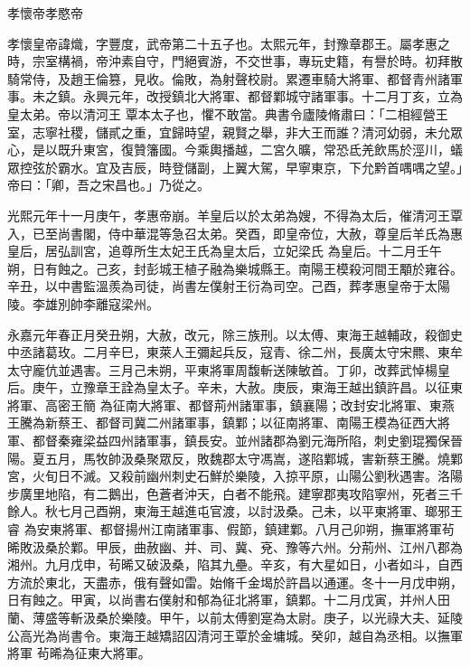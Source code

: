 
\begin{pinyinscope}

 孝懷帝孝愍帝



 孝懷皇帝諱熾，字豐度，武帝第二十五子也。太熙元年，封豫章郡王。屬孝惠之時，宗室構禍，帝沖素自守，門絕賓游，不交世事，專玩史籍，有譽於時。初拜散騎常侍，及趙王倫篡，見收。倫敗，為射聲校尉。累遷車騎大將軍、都督青州諸軍事。未之鎮。永興元年，改授鎮北大將軍、都督鄴城守諸軍事。十二月丁亥，立為皇太弟。帝以清河王
 覃本太子也，懼不敢當。典書令廬陵脩肅曰：「二相經營王室，志寧社稷，儲貳之重，宜歸時望，親賢之舉，非大王而誰？清河幼弱，未允眾心，是以既升東宮，復贊籓國。今乘輿播越，二宮久曠，常恐氐羌飲馬於涇川，蟻眾控弦於霸水。宜及吉辰，時登儲副，上翼大駕，早寧東京，下允黔首喁喁之望。」帝曰：「卿，吾之宋昌也。」乃從之。



 光熙元年十一月庚午，孝惠帝崩。羊皇后以於太弟為嫂，不得為太后，催清河王覃入，已至尚書閣，侍中華混等急召太弟。癸酉，即皇帝位，大赦，尊皇后羊氏為惠皇后，居弘訓宮，追尊所生太妃王氏為皇太后，立妃梁氏
 為皇后。十二月壬午朔，日有蝕之。己亥，封彭城王植子融為樂城縣王。南陽王模殺河間王顒於雍谷。辛丑，以中書監溫羨為司徒，尚書左僕射王衍為司空。己酉，葬孝惠皇帝于太陽陵。李雄別帥李離寇梁州。



 永嘉元年春正月癸丑朔，大赦，改元，除三族刑。以太傅、東海王越輔政，殺御史中丞諸葛玫。二月辛巳，東萊人王彌起兵反，寇青、徐二州，長廣太守宋羆、東牟太守龐伉並遇害。三月己未朔，平東將軍周馥斬送陳敏首。丁卯，改葬武悼楊皇后。庚午，立豫章王詮為皇太子。辛未，大赦。庚辰，東海王越出鎮許昌。以征東將軍、高密王簡
 為征南大將軍、都督荊州諸軍事，鎮襄陽；改封安北將軍、東燕王騰為新蔡王、都督司冀二州諸軍事，鎮鄴；以征南將軍、南陽王模為征西大將軍、都督秦雍梁益四州諸軍事，鎮長安。並州諸郡為劉元海所陷，刺史劉琨獨保晉陽。夏五月，馬牧帥汲桑聚眾反，敗魏郡太守馮嵩，遂陷鄴城，害新蔡王騰。燒鄴宮，火旬日不滅。又殺前幽州刺史石鮮於樂陵，入掠平原，山陽公劉秋遇害。洛陽步廣里地陷，有二鵝出，色蒼者沖天，白者不能飛。建寧郡夷攻陷寧州，死者三千餘人。秋七月己酉朔，東海王越進屯官渡，以討汲桑。己未，以平東將軍、瑯邪王睿
 為安東將軍、都督揚州江南諸軍事、假節，鎮建鄴。八月己卯朔，撫軍將軍茍晞敗汲桑於鄴。甲辰，曲赦幽、并、司、冀、兗、豫等六州。分荊州、江州八郡為湘州。九月戊申，茍晞又破汲桑，陷其九壘。辛亥，有大星如日，小者如斗，自西方流於東北，天盡赤，俄有聲如雷。始脩千金堨於許昌以通運。冬十一月戊申朔，日有蝕之。甲寅，以尚書右僕射和郁為征北將軍，鎮鄴。十二月戊寅，并州人田蘭、薄盛等斬汲桑於樂陵。甲午，以前太傅劉寔為太尉。庚子，以光祿大夫、延陵公高光為尚書令。東海王越矯詔囚清河王覃於金墉城。癸卯，越自為丞相。以撫軍將軍
 茍晞為征東大將軍。




\end{pinyinscope}
